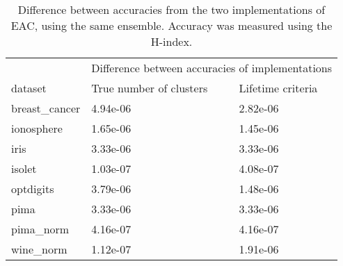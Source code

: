 \begin{table}[h]
\centering
\caption{Difference between accuracies from the two implementations of EAC, using the same ensemble. Accuracy was measured using the H-index.}

\begin{tabular}{lll}
\toprule
         &        \multicolumn{2}{c}{Difference between accuracies of implementations} \\
dataset &      True number of clusters & Lifetime criteria \\
\midrule
breast\_cancer &  4.94e-06 &     2.82e-06 \\
ionosphere     &  1.65e-06 &      1.45e-06 \\
iris           &  3.33e-06 &      3.33e-06 \\
isolet         &  1.03e-07 &      4.08e-07 \\
optdigits      &  3.79e-06 &      1.48e-06 \\
pima           &  3.33e-06 &      3.33e-06 \\
pima\_norm     &  4.16e-07 &      4.16e-07 \\
wine\_norm     &  1.12e-07 &      1.91e-06 \\
\bottomrule
\end{tabular}

\label{tab:validation error acc}
\end{table}







